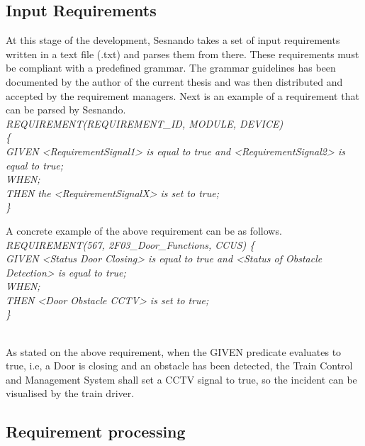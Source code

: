 \subsection{Input Requirements}
\label{subsec:sesnando_input}

At this stage of the development, Sesnando takes a set of input requirements written in a text file (.txt) and parses them from there. These requirements must be compliant with a predefined grammar. The grammar guidelines \cite{sesnando-req-guidelines} has been documented by the author of the current thesis and was then distributed and accepted by the requirement managers. Next is an example of a requirement that can be parsed by Sesnando.\\


\textit{
REQUIREMENT(REQUIREMENT\_ID, MODULE, DEVICE)\\
\{\\
	GIVEN <RequirementSignal1> is equal to true and <RequirementSignal2> is equal to true;\\
	WHEN;\\
	THEN the <RequirementSignalX> is set to true;\\
\}
}\\
\label{eq:requirement_example}


A concrete example of the above requirement can be as follows.\\


\textit{
REQUIREMENT(567, 2F03\_Door\_Functions, CCUS) 
\{\\
	GIVEN <Status Door Closing> is equal to true and <Status of Obstacle Detection> is equal to true;\\
	WHEN;\\
	THEN <Door Obstacle CCTV> is set to true;\\
\}\\
}\\
\label{eq:requirement_example2}

As stated on the above requirement, when the GIVEN predicate evaluates to true, i.e, a Door is closing and an obstacle has been detected, the Train Control and Management System shall set a CCTV signal to true, so the incident can be visualised by the train driver.

\newpage

\subsection{Requirement processing}
\label{subsec:requirement_processing}

